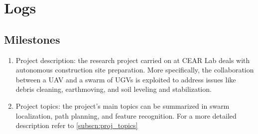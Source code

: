 \section{Logs}
\subsection{Milestones}
\label{subscn:milestones}

\begin{enumerate}
    \item Project description: the research project carried on at CEAR Lab deals with autonomous construction site preparation. More specifically, the collaboration between a UAV and a swarm of UGVs is exploited to address issues like debris cleaning, earthmoving, and soil leveling and stabilization. 
    \item Project topics: the project's main topics can be summarized in swarm localization, path planning, and feature recognition. For a more detailed description refer to \cref{subscn:proj_topics}
\end{enumerate}


